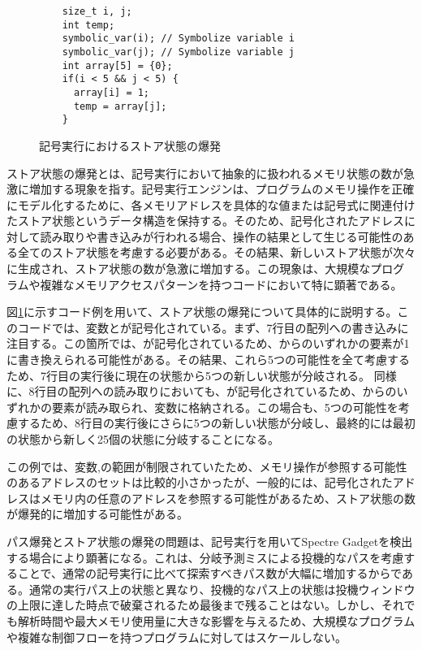 \begin{figure}
  \begin{verbatim}
    size_t i, j;
    int temp;
    symbolic_var(i); // Symbolize variable i
    symbolic_var(j); // Symbolize variable j
    int array[5] = {0};
    if(i < 5 && j < 5) {
      array[i] = 1;
      temp = array[j];
    }
\end{verbatim}
  \caption{記号実行におけるストア状態の爆発}
  \label{store_explosion}
\end{figure}


ストア状態の爆発とは、記号実行において抽象的に扱われるメモリ状態の数が急激に増加する現象を指す。記号実行エンジンは、プログラムのメモリ操作を正確にモデル化するために、各メモリアドレスを具体的な値または記号式に関連付けたストア状態というデータ構造を保持する。そのため、記号化されたアドレスに対して読み取りや書き込みが行われる場合、操作の結果として生じる可能性のある全てのストア状態を考慮する必要がある。その結果、新しいストア状態が次々に生成され、ストア状態の数が急激に増加する。この現象は、大規模なプログラムや複雑なメモリアクセスパターンを持つコードにおいて特に顕著である。\par

図\ref{store_explosion}に示すコード例を用いて、ストア状態の爆発について具体的に説明する。このコードでは、変数とが記号化されている。まず、7行目の配列への書き込みに注目する。この箇所では、が記号化されているため、からのいずれかの要素が1に書き換えられる可能性がある。その結果、これら5つの可能性を全て考慮するため、7行目の実行後に現在の状態から5つの新しい状態が分岐される。
同様に、8行目の配列への読み取りにおいても、が記号化されているため、からのいずれかの要素が読み取られ、変数に格納される。この場合も、5つの可能性を考慮するため、8行目の実行後にさらに5つの新しい状態が分岐し、最終的には最初の状態から新しく25個の状態に分岐することになる。\par
この例では、変数,の範囲が制限されていたため、メモリ操作が参照する可能性のあるアドレスのセットは比較的小さかったが、一般的には、記号化されたアドレスはメモリ内の任意のアドレスを参照する可能性があるため、ストア状態の数が爆発的に増加する可能性がある。\par
パス爆発とストア状態の爆発の問題は、記号実行を用いてSpectre Gadgetを検出する場合により顕著になる。これは、分岐予測ミスによる投機的なパスを考慮することで、通常の記号実行に比べて探索すべきパス数が大幅に増加するからである。通常の実行パス上の状態と異なり、投機的なパス上の状態は投機ウィンドウの上限に達した時点で破棄されるため最後まで残ることはない。しかし、それでも解析時間や最大メモリ使用量に大きな影響を与えるため、大規模なプログラムや複雑な制御フローを持つプログラムに対してはスケールしない。\par

